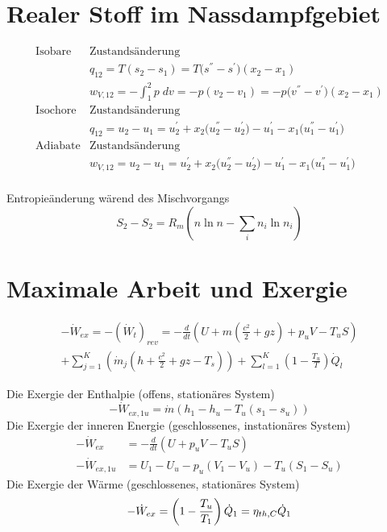 \documentclass[twocolumn]{article}
\begin{document}
\section{Realer Stoff im Nassdampfgebiet}
\begin{align*}
	\text{Isobare} &\text{Zustandsänderung} \\
	&q_{12} = T(s_2 - s_1) = T\Big(s^{''} - s^{'}\Big)(x_2-x_1) \\
	&w_{V,12} = - \int_{1}^{2} p\; dv = -p(v_2-v_1) = -p\Big(v^{''} -v^{'}\Big)(x_2-x_1) \\
	\text{Isochore} &\text{Zustandsänderung} \\
	&q_{12} = u_2 - u_1 = u_2^{'} + x_2\Big(u_2^{''} - u_2^{'} \Big) - u_1^{'} - x_1\Big(u_1^{''} - u_1^{'}\Big) \\
	\text{Adiabate} &\text{Zustandsänderung} \\
	& w_{V,12} = u_2 - u_1 = u_2^{'} + x_2 \Big( u_2^{''} - u_2^{'} \Big) - u_1^{'} - x_1\Big(u_1^{''} - u_1^{'}\Big) \\
\end{align*}

Entropieänderung wärend des Mischvorgangs
\begin{equation}
	S_2-S_2 = R_m \left ( n \ln n - \sum_{i}^{} n_i \ln n_i \right )
\end{equation}
\section{Maximale Arbeit und Exergie}

\begin{multline}
	-\dot{W}_{ex} = - (\dot{W}_t)_{rev} = -\frac{d}{dt} \left( U + m\left ( \frac{c^2}{2}+ gz \right) + p_uV - T_uS \right) \\  +  \sum_{j=1}^{K} \left(\dot{m}_j \left(h + \frac{c^2}{2} + gz -T_s \right) \right) + \sum_{l=1}^{K} \left( 1 - \frac{T_u}{T}\right) \dot{Q}_l 
\end{multline}

Die Exergie der Enthalpie (offens, stationäres System)
\begin{equation}
	-\dot{W}_{ex,1u} = \dot{m}(h_1 - h_u -T_u(s_1 - s_u))
\end{equation}
Die Exergie der inneren Energie (geschlossenes, instationäres System)
\begin{align}
	- \dot{W}_{ex} &= - \frac{d}{dt}(U + p_uV -T_uS) \\
	-\dot{W}_{ex,1u} &= U_1 - U_u -p_u(V_1 - V_u) - T_u(S_1 - S_u)
\end{align}
Die Exergie der Wärme (geschlossenes, stationäres System)
\begin{equation}
	- \dot{W}_{ex} = \left(1 - \frac{T_u}{T_1} \right) \dot{Q}_1 = \eta_{th,C} \dot{Q}_1 \\
\end{equation}
\end{document}
